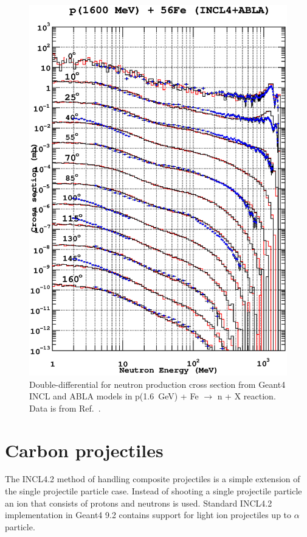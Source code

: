 \documentclass[a4paper]{jpconf}
\begin{document}
\begin{figure}
\begin{center}
\includegraphics[scale=0.70]{images/proton1600MeVFe.eps}
\caption{\label{fig:neutronFe}Double-differential for neutron production cross section
    from Geant4 INCL and ABLA models in p(1.6~GeV) + Fe $\rightarrow$ n + X reaction.
Data is from Ref.~\cite{data}.}

\end{center}

\end{figure}

\section{Carbon projectiles}\label{sec:carbon}
The INCL4.2 method of handling composite projectiles is a simple extension 
of the single projectile particle case. 
Instead of shooting a single projectile particle an ion that consists of protons and neutrons is used.
Standard INCL4.2 implementation in Geant4 9.2 contains support for light ion projectiles 
up to $\alpha$ particle.
\end{document}
